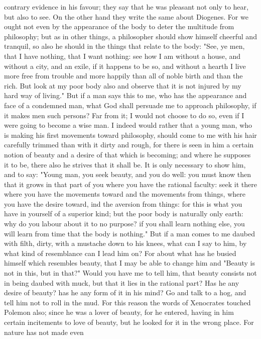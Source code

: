 \documentclass[a4paper]{article}
\begin{document}
contrary evidence in his favour; they say that he was pleasant not only to
hear, but also to see. On the other hand they write the same about Diogenes.
For we ought not even by the appearance of the body to deter the multitude from
philosophy; but as in other things, a philosopher should show himself cheerful
and tranquil, so also he should in the things that relate to the body: "See, ye
men, that I have nothing, that I want nothing: see how I am without a house,
and without a city, and an exile, if it happens to be so, and without a hearth
I live more free from trouble and more happily than all of noble birth and than
the rich. But look at my poor body also and observe that it is not injured by
my hard way of living." But if a man says this to me, who has the appearance
and face of a condemned man, what God shall persuade me to approach philosophy,
if it makes men such persons? Far from it; I would not choose to do so, even if
I were going to become a wise man. I indeed would rather that a young man, who
is making his first movements toward philosophy, should come to me with his
hair carefully trimmed than with it dirty and rough, for there is seen in him a
certain notion of beauty and a desire of that which is becoming; and where he
supposes it to be, there also he strives that it shall be. It is only necessary
to show him, and to say: "Young man, you seek beauty, and you do well: you must
know then that it grows in that part of you where you have the rational
faculty: seek it there where you have the movements toward and the movements
from things, where you have the desire toward, ind the aversion from things:
for this is what you have in yourself of a superior kind; but the poor body is
naturally only earth: why do you labour about it to no purpose? if you shall
learn nothing else, you will learn from time that the body is nothing." But if
a man comes to me daubed with filth, dirty, with a mustache down to his knees,
what can I say to him, by what kind of resemblance can I lead him on? For about
what has he busied himself which resembles beauty, that I may be able to change
him and "Beauty is not in this, but in that?" Would you have me to tell him,
that beauty consists not in being daubed with muck, but that it lies in the
rational part? Has he any desire of beauty? has he any form of it in his mind?
Go and talk to a hog, and tell him not to roll in the mud.
    For this reason the words of Xenocrates touched Polemon also; since he was
a lover of beauty, for he entered, having in him certain incitements to love of
beauty, but he looked for it in the wrong place. For nature has not made even
\end{document}
